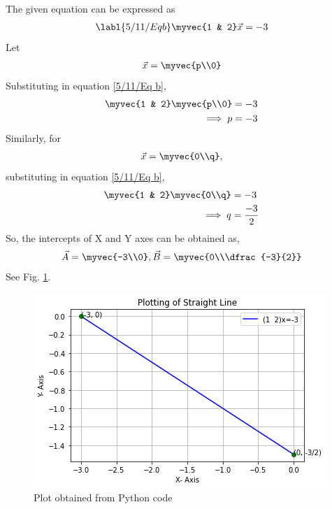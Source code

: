 The given equation can be expressed as 
\begin{align} \labl{5/11/Eq b}
\myvec{1 & 2}\vec{x} =-3 
\end{align}
Let 
\begin{align}
\vec{x}=\myvec{p\\0}
\end{align}
Substituting in equation \eqref{5/11/Eq b},
\begin{align}
\myvec{1 & 2} \myvec{p\\0} &= -3
\\ \implies p&= -3
\end{align}
Similarly, for 
\begin{align}
\vec{x}=\myvec{0\\q},
\end{align}
substituting in equation \eqref{5/11/Eq b},
\begin{align}
\myvec{1 & 2} \myvec{0\\q} &= -3
\\ \implies q &= \frac{-3}{2}
\end{align}
So, the intercepts of X and Y axes can be obtained as,
\begin{align}
\vec{A}=\myvec{-3\\0} , 
\vec{B}=\myvec{0\\\dfrac{-3}{2}}
\end{align}
%
See Fig. \ref{5/11/Fig:1}.
%
\begin{figure}[h]
\centering
\includegraphics[width=\columnwidth]{solutions/5/11/graph.png}
\caption{Plot obtained from Python code}
\label{5/11/Fig:1}
\end{figure}


